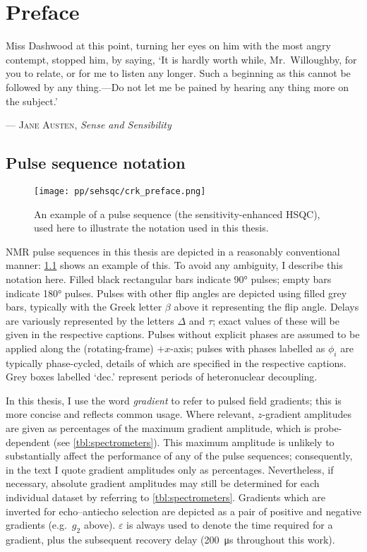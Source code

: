 \chapter{Preface}

\epigraph{\singlespacing%
Miss Dashwood at this point, turning her eyes on him with the most angry contempt, stopped him, by saying, `It is hardly worth while, Mr.\ Willoughby, for you to relate, or for me to listen any longer. Such a beginning as this cannot be followed by any thing.---Do not let me be pained by hearing any thing more on the subject.'
}{--- \textsc{Jane Austen}, \textit{Sense and Sensibility}}

\section*{Pulse sequence notation}

\begin{figure}[ht]
    \centering
    \texttt{[image: pp/sehsqc/crk\_preface.png]}%
    \caption[Example pulse sequence to illustrate notation]{An example of a pulse sequence (the sensitivity-enhanced HSQC), used here to illustrate the notation used in this thesis.}
    \label{fig:preface_sehsqc}
\end{figure}

NMR pulse sequences in this thesis are depicted in a reasonably conventional manner: \cref{fig:preface_sehsqc} shows an example of this.
To avoid any ambiguity, I describe this notation here.
Filled black rectangular bars indicate \ang{90} pulses; empty bars indicate \ang{180} pulses.
Pulses with other flip angles are depicted using filled grey bars, typically with the Greek letter $\beta$ above it representing the flip angle.
Delays are variously represented by the letters $\Delta$ and $\tau$; exact values of these will be given in the respective captions.
Pulses without explicit phases are assumed to be applied along the (rotating-frame) $+x$-axis; pulses with phases labelled as $\phi_i$ are typically phase-cycled, details of which are specified in the respective captions.
Grey boxes labelled `dec.' represent periods of heteronuclear decoupling.

In this thesis, I use the word \textit{gradient} to refer to pulsed field gradients; this is more concise and reflects common usage.
Where relevant, $z$-gradient amplitudes are given as percentages of the maximum gradient amplitude, which is probe-dependent (see \cref{tbl:spectrometers}).
This maximum amplitude is unlikely to substantially affect the performance of any of the pulse sequences; consequently, in the text I quote gradient amplitudes only as percentages.
Nevertheless, if necessary, absolute gradient amplitudes may still be determined for each individual dataset by referring to \cref{tbl:spectrometers}.
Gradients which are inverted for echo--antiecho selection are depicted as a pair of positive and negative gradients (e.g.\ $g_2$ above).
$\varepsilon$ is always used to denote the time required for a gradient, plus the subsequent recovery delay (\qty{200}{\us} throughout this work).

